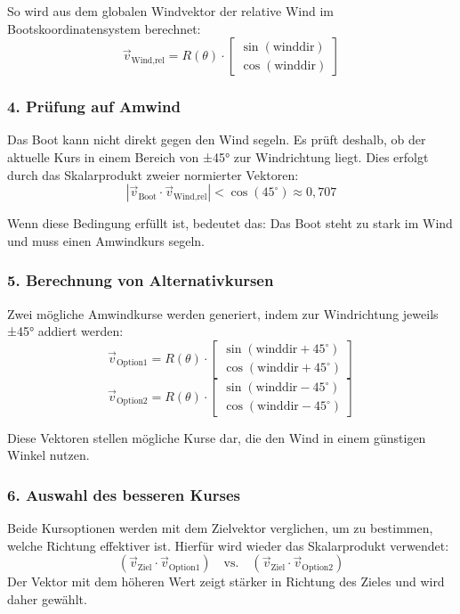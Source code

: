 So wird aus dem globalen Windvektor der relative Wind im Bootskoordinatensystem berechnet:
\[
\vec{v}_{\text{Wind,rel}} = R(\theta) \cdot \begin{bmatrix}\sin(\text{winddir}) \\ \cos(\text{winddir})\end{bmatrix}
\]

\subsubsection*{4. Prüfung auf Amwind}

Das Boot kann nicht direkt gegen den Wind segeln. Es prüft deshalb, ob der aktuelle Kurs in einem Bereich von ±45° zur Windrichtung liegt. Dies erfolgt durch das Skalarprodukt zweier normierter Vektoren:
\[
|\vec{v}_{\text{Boot}} \cdot \vec{v}_{\text{Wind,rel}}| < \cos(45^\circ) \approx 0{,}707
\]

Wenn diese Bedingung erfüllt ist, bedeutet das: Das Boot steht zu stark im Wind und muss einen Amwindkurs segeln.

\subsubsection*{5. Berechnung von Alternativkursen}

Zwei mögliche Amwindkurse werden generiert, indem zur Windrichtung jeweils ±45° addiert werden:
\[
\vec{v}_{\text{Option1}} = R(\theta) \cdot 
\begin{bmatrix}
\sin(\text{winddir} + 45^\circ) \\
\cos(\text{winddir} + 45^\circ)
\end{bmatrix}
\]
\[
\vec{v}_{\text{Option2}} = R(\theta) \cdot 
\begin{bmatrix}
\sin(\text{winddir} - 45^\circ) \\
\cos(\text{winddir} - 45^\circ)
\end{bmatrix}
\]

Diese Vektoren stellen mögliche Kurse dar, die den Wind in einem günstigen Winkel nutzen.

\subsubsection*{6. Auswahl des besseren Kurses}

Beide Kursoptionen werden mit dem Zielvektor verglichen, um zu bestimmen, welche Richtung effektiver ist. Hierfür wird wieder das Skalarprodukt verwendet:
\[
(\vec{v}_{\text{Ziel}} \cdot \vec{v}_{\text{Option1}}) 
\quad \text{vs.} \quad
(\vec{v}_{\text{Ziel}} \cdot \vec{v}_{\text{Option2}})
\]
Der Vektor mit dem höheren Wert zeigt stärker in Richtung des Zieles und wird daher gewählt.


